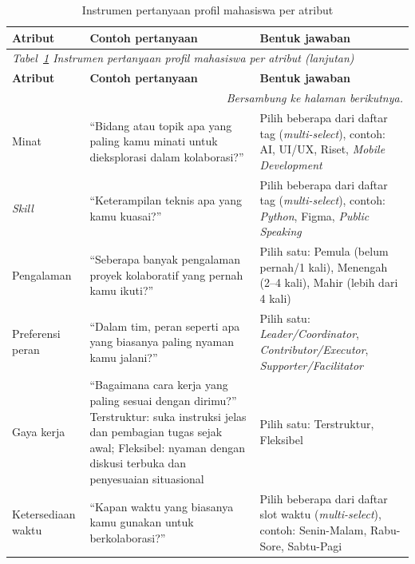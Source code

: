 \begin{longtable}{p{2.5cm} p{5cm} >{\raggedright\arraybackslash}p{\dimexpr\linewidth-7.5cm-6\tabcolsep\relax}}
  \caption{Instrumen pertanyaan profil mahasiswa per atribut}
  \label{tab:instrumen-profil} \\
  \toprule
    \textbf{Atribut} & \textbf{Contoh pertanyaan} & \textbf{Bentuk jawaban} \\
  \midrule
  \endfirsthead
  \multicolumn{3}{l}{\small\textit{Tabel~\ref{tab:instrumen-profil} Instrumen pertanyaan profil mahasiswa per atribut (lanjutan)}} \\
  \toprule
    \textbf{Atribut} & \textbf{Contoh pertanyaan} & \textbf{Bentuk jawaban} \\
  \midrule
  \endhead
  \bottomrule
  \multicolumn{3}{r}{\textit{Bersambung ke halaman berikutnya.}} \\
  \endfoot
  \bottomrule
  \endlastfoot
    Minat & ``Bidang atau topik apa yang paling kamu minati untuk dieksplorasi dalam kolaborasi?'' & Pilih beberapa dari daftar tag (\emph{multi-select}), contoh: AI, UI/UX, Riset, \emph{Mobile Development} \\
    \midrule
    \emph{Skill} & ``Keterampilan teknis apa yang kamu kuasai?'' & Pilih beberapa dari daftar tag (\emph{multi-select}), contoh: \emph{Python}, Figma, \emph{Public Speaking} \\
    \midrule
    Pengalaman & ``Seberapa banyak pengalaman proyek kolaboratif yang pernah kamu ikuti?'' & Pilih satu: Pemula (belum pernah/1 kali), Menengah (2--4 kali), Mahir (lebih dari 4 kali) \\
    \midrule
    Preferensi peran & ``Dalam tim, peran seperti apa yang biasanya paling nyaman kamu jalani?'' & Pilih satu: \emph{Leader/Coordinator}, \emph{Contributor/Executor}, \emph{Supporter/Facilitator} \\
    \midrule
    Gaya kerja & ``Bagaimana cara kerja yang paling sesuai dengan dirimu?'' Terstruktur: suka instruksi jelas dan pembagian tugas sejak awal; Fleksibel: nyaman dengan diskusi terbuka dan penyesuaian situasional & Pilih satu: Terstruktur, Fleksibel \\
    \midrule
    Ketersediaan waktu & ``Kapan waktu yang biasanya kamu gunakan untuk berkolaborasi?'' & Pilih beberapa dari daftar slot waktu (\emph{multi-select}), contoh: Senin-Malam, Rabu-Sore, Sabtu-Pagi \\
\end{longtable}

